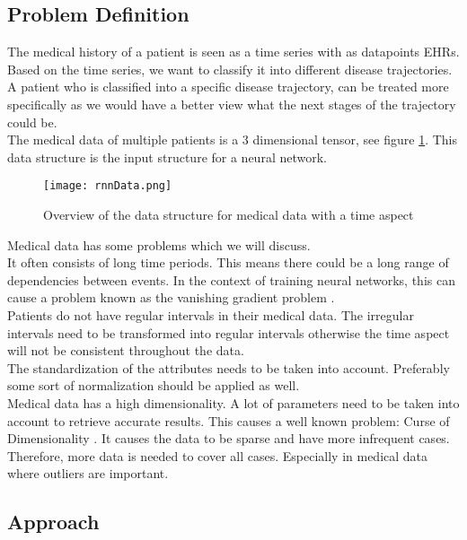 \subsection{Problem Definition}

The medical history of a patient is seen as a time series with as datapoints EHRs. Based on the time series, we want to classify it into different disease trajectories. A patient who is classified into a specific disease trajectory, can be treated more specifically as we would have a better view what the next stages of the trajectory could be. \\

The medical data of multiple patients is a $3$ dimensional tensor, see figure \ref{fig:rnnData}. This data structure is the input structure for a neural network.

\begin{figure}[!htb]
	\centering
	\texttt{[image: rnnData.png]}
	\caption{Overview of the data structure for medical data with a time aspect \cite{dl4jRnn:online}}
	\label{fig:rnnData}
\end{figure} 

Medical data has some problems which we will discuss.\\
It often consists of long time periods. This means there could be a long range of dependencies between events. In the context of training neural networks, this can cause a problem known as the vanishing gradient problem \cite{vanishingproblem:article}. \\
Patients do not have regular intervals in their medical data. The irregular intervals need to be transformed into regular intervals otherwise the time aspect will not be consistent throughout the data. \\
The standardization of the attributes needs to be taken into account. Preferably some sort of normalization should be applied as well. \\
Medical data has a high dimensionality. A lot of parameters need to be taken into account to retrieve accurate results. This causes a well known problem: Curse of Dimensionality \cite {curseofdim:book}. It causes the data to be sparse and have more infrequent cases. Therefore, more data is needed to cover all cases. Especially in medical data where outliers are important. 


\subsection{Approach}

